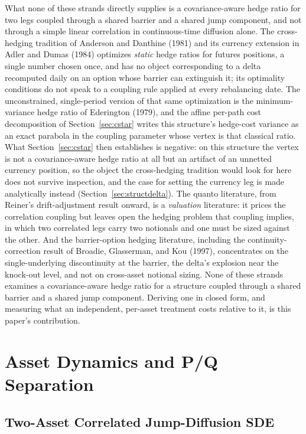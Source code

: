 \documentclass[11pt,a4paper]{article}
\begin{document}
What none of these strands directly supplies is a covariance-aware hedge ratio for two legs coupled through a shared barrier and a shared jump component, and not through a simple linear correlation in continuous-time diffusion alone. The cross-hedging tradition of Anderson and Danthine (1981) and its currency extension in Adler and Dumas (1984) optimizes \emph{static} hedge ratios for futures positions, a single number chosen once, and has no object corresponding to a delta recomputed daily on an option whose barrier can extinguish it; its optimality conditions do not speak to a coupling rule applied at every rebalancing date. The unconstrained, single-period version of that same optimization is the minimum-variance hedge ratio of Ederington (1979), and the affine per-path cost decomposition of Section~\ref{sec:cstar} writes this structure's hedge-cost variance as an exact parabola in the coupling parameter whose vertex is that classical ratio. What Section~\ref{sec:cstar} then establishes is negative: on this structure the vertex is not a covariance-aware hedge ratio at all but an artifact of an unnetted currency position, so the object the cross-hedging tradition would look for here does not survive inspection, and the case for setting the currency leg is made analytically instead (Section~\ref{sec:structdelta}). The quanto literature, from Reiner's drift-adjustment result onward, is a \emph{valuation} literature: it prices the correlation coupling but leaves open the hedging problem that coupling implies, in which two correlated legs carry two notionals and one must be sized against the other. And the barrier-option hedging literature, including the continuity-correction result of Broadie, Glasserman, and Kou (1997), concentrates on the single-underlying discontinuity at the barrier, the delta's explosion near the knock-out level, and not on cross-asset notional sizing. None of these strands examines a covariance-aware hedge ratio for a structure coupled through a shared barrier and a shared jump component. Deriving one in closed form, and measuring what an independent, per-asset treatment costs relative to it, is this paper's contribution.

\section{Asset Dynamics and P/Q Separation}
\label{sec:dynamics}

\subsection{Two-Asset Correlated Jump-Diffusion SDE}
\label{sec:sde}
\end{document}
